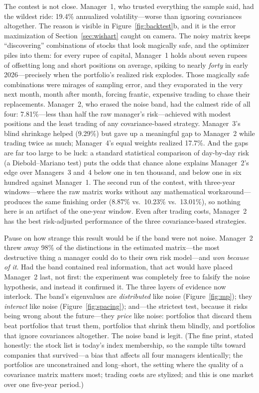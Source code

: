 \documentclass[11pt]{article}
\begin{document}
The contest is not close. Manager~1, who trusted everything the sample
said, had the wildest ride: 19.4\% annualized volatility---worse than
ignoring covariances altogether. The reason is visible in
Figure~\ref{fig:backtest}b, and it is the error maximization of
Section~\ref{sec:wishart} caught on camera. The noisy matrix keeps
``discovering'' combinations of stocks that look magically safe, and the
optimizer piles into them: for every rupee of capital, Manager~1 holds
about seven rupees of offsetting long and short positions on average,
spiking to nearly \emph{forty} in early 2026---precisely when the
portfolio's realized risk explodes. Those magically safe combinations
were mirages of sampling error, and they evaporated in the very next
month, month after month, forcing frantic, expensive trading to chase
their replacements. Manager~2, who erased the noise band, had the
calmest ride of all four: 7.81\%---less than half the raw manager's
risk---achieved with modest positions and the least trading of any
covariance-based strategy. Manager~3's blind shrinkage helped
(9.29\%) but gave up a meaningful gap to Manager~2 while trading twice
as much; Manager~4's equal weights realized 17.7\%. And the gaps are
far too large to be luck: a standard statistical comparison of
day-by-day risk (a Diebold--Mariano test) puts the odds that chance
alone explains Manager~2's edge over Managers~3 and~4 below one in ten
thousand, and below one in six hundred against Manager~1. The second
run of the contest, with three-year windows---where the raw matrix works
without any mathematical workaround---produces the same finishing order
(8.87\% vs.\ 10.23\% vs.\ 13.01\%), so nothing here is an artifact of
the one-year window. Even after trading costs, Manager~2 has the best
risk-adjusted performance of the three covariance-based strategies.

Pause on how strange this result would be if the band were not noise.
Manager~2 threw away 98\% of the distinctions in the estimated
matrix---the most destructive thing a manager could do to their own
risk model---and \emph{won because of it}. Had the band contained real
information, that act would have placed Manager~2 last, not first: the
experiment was completely free to falsify the noise hypothesis, and
instead it confirmed it. The three layers of evidence now interlock.
The band's eigenvalues are \emph{distributed} like noise
(Figure~\ref{fig:mp}); they \emph{interact} like noise
(Figure~\ref{fig:spacing}); and---the strictest test, because it risks
being wrong about the future---they \emph{price} like noise: portfolios
that discard them beat portfolios that trust them, portfolios that
shrink them blindly, and portfolios that ignore covariances altogether.
The noise band is legit. (The fine print, stated honestly: the stock
list is today's index membership, so the sample tilts toward companies
that survived---a bias that affects all four managers identically; the
portfolios are unconstrained and long--short, the setting where the
quality of a covariance matrix matters most; trading costs are
stylized; and this is one market over one five-year period.)
\end{document}
